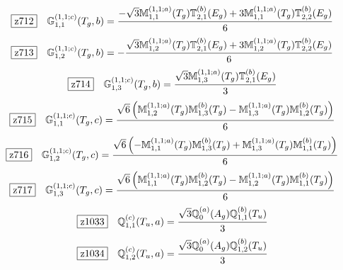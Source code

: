 \documentclass[fleqn,10pt,landscape]{jsarticle}
\begin{document}
\begin{dmath*}
\hspace*{3mm}\fbox{z712}\quad \mathbb{G}_{1,1}^{(1,1;c)}(T_{g},b)=\frac{- \sqrt{3} \mathbb{M}_{1,1}^{(1,1;a)}(T_{g}) \mathbb{T}_{2,1}^{(b)}(E_{g}) + 3 \mathbb{M}_{1,1}^{(1,1;a)}(T_{g}) \mathbb{T}_{2,2}^{(b)}(E_{g})}{6}
\end{dmath*}
\begin{dmath*}
\hspace*{3mm}\fbox{z713}\quad \mathbb{G}_{1,2}^{(1,1;c)}(T_{g},b)=- \frac{\sqrt{3} \mathbb{M}_{1,2}^{(1,1;a)}(T_{g}) \mathbb{T}_{2,1}^{(b)}(E_{g}) + 3 \mathbb{M}_{1,2}^{(1,1;a)}(T_{g}) \mathbb{T}_{2,2}^{(b)}(E_{g})}{6}
\end{dmath*}
\begin{dmath*}
\hspace*{3mm}\fbox{z714}\quad \mathbb{G}_{1,3}^{(1,1;c)}(T_{g},b)=\frac{\sqrt{3} \mathbb{M}_{1,3}^{(1,1;a)}(T_{g}) \mathbb{T}_{2,1}^{(b)}(E_{g})}{3}
\end{dmath*}
\begin{dmath*}
\hspace*{3mm}\fbox{z715}\quad \mathbb{G}_{1,1}^{(1,1;c)}(T_{g},c)=\frac{\sqrt{6} \left(\mathbb{M}_{1,2}^{(1,1;a)}(T_{g}) \mathbb{M}_{1,3}^{(b)}(T_{g}) - \mathbb{M}_{1,3}^{(1,1;a)}(T_{g}) \mathbb{M}_{1,2}^{(b)}(T_{g})\right)}{6}
\end{dmath*}
\begin{dmath*}
\hspace*{3mm}\fbox{z716}\quad \mathbb{G}_{1,2}^{(1,1;c)}(T_{g},c)=\frac{\sqrt{6} \left(- \mathbb{M}_{1,1}^{(1,1;a)}(T_{g}) \mathbb{M}_{1,3}^{(b)}(T_{g}) + \mathbb{M}_{1,3}^{(1,1;a)}(T_{g}) \mathbb{M}_{1,1}^{(b)}(T_{g})\right)}{6}
\end{dmath*}
\begin{dmath*}
\hspace*{3mm}\fbox{z717}\quad \mathbb{G}_{1,3}^{(1,1;c)}(T_{g},c)=\frac{\sqrt{6} \left(\mathbb{M}_{1,1}^{(1,1;a)}(T_{g}) \mathbb{M}_{1,2}^{(b)}(T_{g}) - \mathbb{M}_{1,2}^{(1,1;a)}(T_{g}) \mathbb{M}_{1,1}^{(b)}(T_{g})\right)}{6}
\end{dmath*}
\begin{dmath*}
\hspace*{3mm}\fbox{z1033}\quad \mathbb{Q}_{1,1}^{(c)}(T_{u},a)=\frac{\sqrt{3} \mathbb{Q}_{0}^{(a)}(A_{g}) \mathbb{Q}_{1,1}^{(b)}(T_{u})}{3}
\end{dmath*}
\begin{dmath*}
\hspace*{3mm}\fbox{z1034}\quad \mathbb{Q}_{1,2}^{(c)}(T_{u},a)=\frac{\sqrt{3} \mathbb{Q}_{0}^{(a)}(A_{g}) \mathbb{Q}_{1,2}^{(b)}(T_{u})}{3}
\end{dmath*}
\end{document}
